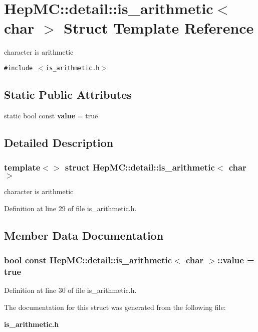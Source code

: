 \section{Hep\-MC::detail::is\_\-arithmetic$<$ char $>$ Struct Template Reference}
\label{structHepMC_1_1detail_1_1is__arithmetic_3_01char_01_4}
character is arithmetic  


{\tt \#include $<$is\_\-arithmetic.h$>$}

\subsection*{Static Public Attributes}
\begin{CompactItemize}
\item 
static bool const {\bf value} = true
\end{CompactItemize}


\subsection{Detailed Description}
\subsubsection*{template$<$$>$ struct Hep\-MC::detail::is\_\-arithmetic$<$ char $>$}

character is arithmetic 



Definition at line 29 of file is\_\-arithmetic.h.

\subsection{Member Data Documentation}
\subsubsection{\setlength{\rightskip}{0pt plus 5cm}bool const {\bf Hep\-MC::detail::is\_\-arithmetic}$<$ char $>$::{\bf value} = true\hspace{0.3cm}{\tt  [static]}}\label{structHepMC_1_1detail_1_1is__arithmetic_3_01char_01_4_5fb6287c231568d405d97bb739395d33}




Definition at line 30 of file is\_\-arithmetic.h.

The documentation for this struct was generated from the following file:\begin{CompactItemize}
\item 
{\bf is\_\-arithmetic.h}\end{CompactItemize}
